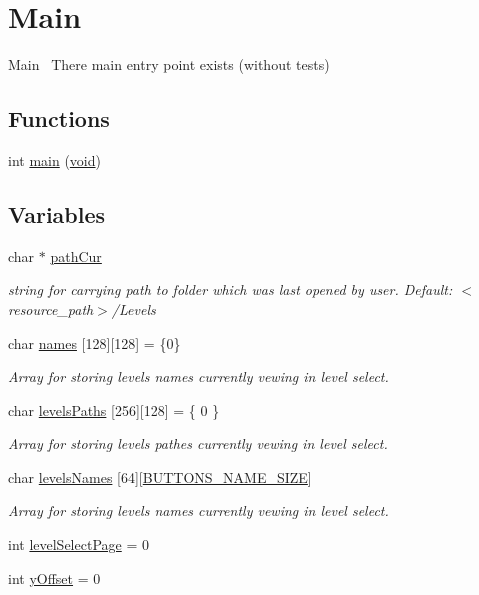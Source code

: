 \hypertarget{group___main}{}\section{Main}
\label{group___main}


Main~\newline
There main entry point exists (without tests)  


\subsection*{Functions}
\begin{DoxyCompactItemize}
\item 
int \hyperlink{group___main_ga840291bc02cba5474a4cb46a9b9566fe}{main} (\hyperlink{png_8h_ac9c84fa68bbad002983e35ce3663c686}{void})
\end{DoxyCompactItemize}
\subsection*{Variables}
\begin{DoxyCompactItemize}
\item 
char $\ast$ \hyperlink{group___main_ga39642f859bbe17ccc6e6d98f84a7cdea}{path\+Cur}
\begin{DoxyCompactList}\small\item\em string for carrying path to folder which was last opened by user. Default\+: $<$resource\+\_\+path$>$/\+Levels \end{DoxyCompactList}\item 
char \hyperlink{group___main_ga6341080327d9c3d3ef08fdccd4f05262}{names} \mbox{[}128\mbox{]}\mbox{[}128\mbox{]} = \{0\}
\begin{DoxyCompactList}\small\item\em Array for storing levels names currently vewing in level select. \end{DoxyCompactList}\item 
char \hyperlink{group___main_ga5a00f62db43aff74971290ceba5fa7df}{levels\+Paths} \mbox{[}256\mbox{]}\mbox{[}128\mbox{]} = \{ 0 \}
\begin{DoxyCompactList}\small\item\em Array for storing levels pathes currently vewing in level select. \end{DoxyCompactList}\item 
char \hyperlink{group___main_gae5cb82a78ca4ac2c20f9d071e7124f38}{levels\+Names} \mbox{[}64\mbox{]}\mbox{[}\hyperlink{group___button_ga5a86b4b0ec8a21993f74ae423ec74538}{B\+U\+T\+T\+O\+N\+S\+\_\+\+N\+A\+M\+E\+\_\+\+S\+I\+ZE}\mbox{]}
\begin{DoxyCompactList}\small\item\em Array for storing levels names currently vewing in level select. \end{DoxyCompactList}\item 
int \hyperlink{group___main_ga75f52c6778fb4d3418ef0925d17fb164}{level\+Select\+Page} = 0
\item 
int \hyperlink{group___main_ga016718268d32fcb95b1190cc1071e270}{y\+Offset} = 0
\end{DoxyCompactItemize}


